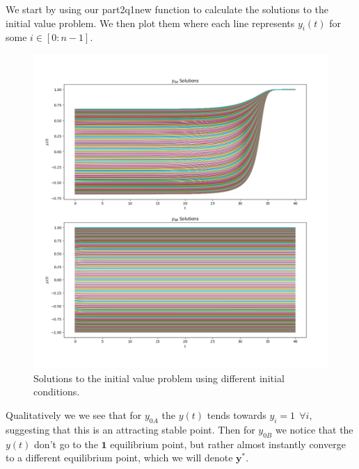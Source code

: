 \documentclass[a4paper, oneside]{book}
\begin{document}
We start by using our part2q1new function to calculate the solutions to the initial value problem. We then plot them where each line represents $y_{i}(t)$ for some $i \in [0:n-1]$.
\begin{figure}[htpb]
    \centering
    \includegraphics[width=1.0\textwidth]{./images/solutions.png}
    \caption{Solutions to the initial value problem using different initial conditions.}
\end{figure}

\clearpage

Qualitatively we we see that for $y_{0A}$ the $y(t)$ tends towards $y_{i} = 1 ~ ~ \forall i$, suggesting that this
is an attracting stable point. Then for $y_{0B}$ we notice that the $y(t)$ don't go to the $\bm{1}$ equilibrium
point, but rather almost instantly converge to a different equilibrium point, which we will
denote $\mathbf{y}^*$. 
\end{document}

